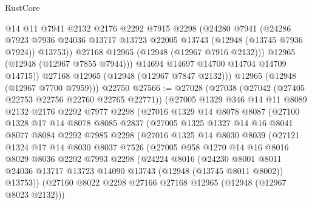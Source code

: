 \begin{lexlean}{RustCore}
\begin{coremodule}
                @14
                @11
                @7941
                @2132
                @2176
                @2292
                @7915
                @2298
                (@24280
                  @7941
                  (@24286
                    @7923
                    @7936
                    @24036
                    @13717
                    @13723
                    @22005
                    @13743
                    (@12948 (@13745 @7936 @7924))
                    @13753))
                @27168
                @12965
                (@12948 (@12967 @7916 @2132)))
              @12965
              (@12948 (@12967 @7855 @7944)))
            @14694
            @14697
            @14700
            @14704
            @14709
            @14715))
        @27168
        @12965
        (@12948 (@12967 @7847 @2132)))
      @12965
      (@12948 (@12967 @7700 @7959)))
    @22750
@27566 := @27028
    (@27038
      (@27042 (@27405 @22753 @22756 @22760 @22765 @22771))
      (@27005
        @1329
        @346
        @14
        @11
        @8089
        @2132
        @2176
        @2292
        @7977
        @2298
        (@27016
          @1329
          @14
          @8078
          @8087
          (@27100
            @1328
            @17
            @14
            @8078
            @8085
            @2837
            (@27005
              @1325
              @1327
              @14
              @16
              @8041
              @8077
              @8084
              @2292
              @7985
              @2298
              (@27016
                @1325
                @14
                @8030
                @8039
                (@27121
                  @1324
                  @17
                  @14
                  @8030
                  @8037
                  @7526
                  (@27005
                    @958
                    @1270
                    @14
                    @16
                    @8016
                    @8029
                    @8036
                    @2292
                    @7993
                    @2298
                    (@24224
                      @8016
                      (@24230
                        @8001
                        @8011
                        @24036
                        @13717
                        @13723
                        @14090
                        @13743
                        (@12948 (@13745 @8011 @8002))
                        @13753))
                    (@27160 @8022 @2298 @27166 @27168 @12965 (@12948 (@12967 @8023 @2132)))

\end{coremodule}
\end{lexlean}

